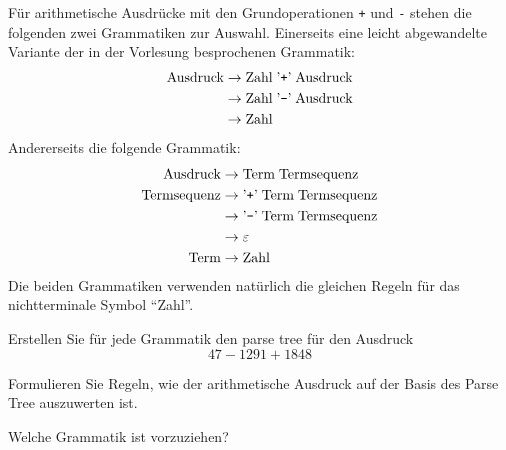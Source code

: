 Für arithmetische Ausdrücke mit den Grundoperationen
{\tt +} und {\tt -} stehen die folgenden zwei Grammatiken
zur Auswahl. Einerseits eine leicht abgewandelte Variante
der in der Vorlesung besprochenen Grammatik:
\begin{align*}
\text{Ausdruck}&\rightarrow \text{Zahl}\;\text{'{\tt +}'}\;\text{Ausdruck} \\
               &\rightarrow \text{Zahl}\;\text{'{\tt -}'}\;\text{Ausdruck} \\
               &\rightarrow \text{Zahl}
\end{align*}
Andererseits die folgende Grammatik:
\begin{align*}
\text{Ausdruck}&\rightarrow \text{Term}\;\text{Termsequenz}\\
\text{Termsequenz}&\rightarrow \text{'{\tt +}'}\; \text{Term}\; \text{Termsequenz}\\
                  &\rightarrow \text{'{\tt -}'}\; \text{Term}\; \text{Termsequenz}\\
                  &\rightarrow \varepsilon\\
 \text{Term}&\rightarrow \text{Zahl}
\end{align*}
Die beiden Grammatiken verwenden natürlich die gleichen Regeln
für das nichtterminale Symbol ``Zahl''.
\begin{teilaufgaben}
\item Erstellen Sie für jede Grammatik den parse tree für den Ausdruck
\[
47-1291+1848
\]
\item Formulieren Sie Regeln, wie der arithmetische Ausdruck auf der
Basis des Parse Tree auszuwerten ist.
\item Welche Grammatik ist vorzuziehen?
\end{teilaufgaben}


